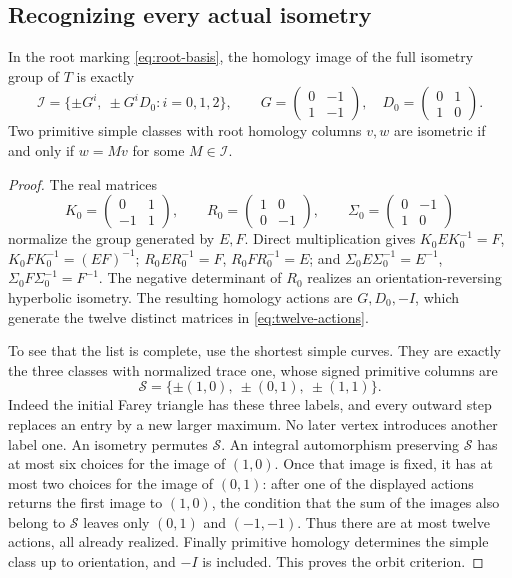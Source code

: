 \subsection{Recognizing every actual isometry}

\begin{proposition}\label{prop:isometry-group}
In the root marking \eqref{eq:root-basis}, the homology image of the full
isometry group of $T$ is exactly
\begin{equation}\label{eq:twelve-actions}
 \mathscr I=\{\pm G^i,\ \pm G^iD_0: i=0,1,2\},\qquad
 G=\begin{pmatrix}0&-1\\1&-1\end{pmatrix},\quad
 D_0=\begin{pmatrix}0&1\\1&0\end{pmatrix}.
\end{equation}
Two primitive simple classes with root homology columns $v,w$ are
isometric if and only if $w=Mv$ for some $M\in\mathscr I$.
\end{proposition}

\begin{proof}
The real matrices
$$
 K_0=\begin{pmatrix}0&1\\-1&1\end{pmatrix},\qquad
 R_0=\begin{pmatrix}1&0\\0&-1\end{pmatrix},\qquad
 \Sigma_0=\begin{pmatrix}0&-1\\1&0\end{pmatrix}
$$
normalize the group generated by $E,F$. Direct multiplication gives
$K_0EK_0^{-1}=F$, $K_0FK_0^{-1}=(EF)^{-1}$;
$R_0ER_0^{-1}=F$, $R_0FR_0^{-1}=E$; and
$\Sigma_0E\Sigma_0^{-1}=E^{-1}$, $\Sigma_0F\Sigma_0^{-1}=F^{-1}$.
The negative determinant of $R_0$ realizes an orientation-reversing
hyperbolic isometry. The resulting homology actions are $G,D_0,-I$,
which generate the twelve distinct matrices in \eqref{eq:twelve-actions}.

To see that the list is complete, use the shortest simple curves.
They are exactly the three classes with normalized trace one, whose
signed primitive columns are
$$
 \mathscr S=\{\pm(1,0),\ \pm(0,1),\ \pm(1,1)\}.
$$
Indeed the initial Farey triangle has these three labels, and every
outward step replaces an entry by a new larger maximum. No later
vertex introduces another label one. An isometry permutes $\mathscr S$.
An integral automorphism preserving $\mathscr S$ has at most six choices
for the image of $(1,0)$. Once that image is fixed, it has at most two
choices for the image of $(0,1)$: after one of the displayed actions
returns the first image to $(1,0)$, the condition that the sum of the
images also belong to $\mathscr S$ leaves only $(0,1)$ and $(-1,-1)$.
Thus there are at most twelve actions, all already realized.
Finally primitive homology determines the simple class up to orientation,
and $-I$ is included. This proves the orbit criterion.
\end{proof}

